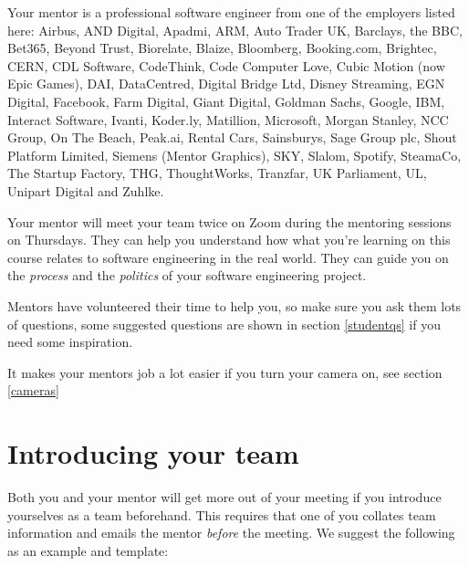 \documentclass[
]{book}
\begin{document}
Your mentor is a professional software engineer from one of the employers listed here: Airbus, AND Digital, Apadmi, ARM, Auto Trader UK, Barclays, the BBC, Bet365, Beyond Trust, Biorelate, Blaize, Bloomberg, Booking.com, Brightec, CERN, CDL Software, CodeThink, Code Computer Love, Cubic Motion (now Epic Games), DAI, DataCentred, Digital Bridge Ltd, Disney Streaming, EGN Digital, Facebook, Farm Digital, Giant Digital, Goldman Sachs, Google, IBM, Interact Software, Ivanti, Koder.ly, Matillion, Microsoft, Morgan Stanley, NCC Group, On The Beach, Peak.ai, Rental Cars, Sainsburys, Sage Group plc, Shout Platform Limited, Siemens (Mentor Graphics), SKY, Slalom, Spotify, SteamaCo, The Startup Factory, THG, ThoughtWorks, Tranzfar, UK Parliament, UL, Unipart Digital and Zuhlke.

Your mentor will meet your team twice on Zoom during the mentoring sessions on Thursdays. They can help you understand how what you're learning on this course relates to software engineering in the real world. They can guide you on the \emph{process} and the \emph{politics} of your software engineering project.

Mentors have volunteered their time to help you, so make sure you ask them lots of questions, some suggested questions are shown in section \ref{studentqs} if you need some inspiration.

It makes your mentors job a lot easier if you turn your camera on, see section \ref{cameras}

\hypertarget{hellomentor}{%
\section{Introducing your team}\label{hellomentor}}

Both you and your mentor will get more out of your meeting if you introduce yourselves as a team beforehand. This requires that one of you collates team information and emails the mentor \emph{before} the meeting. We suggest the following as an example and template:
\end{document}
